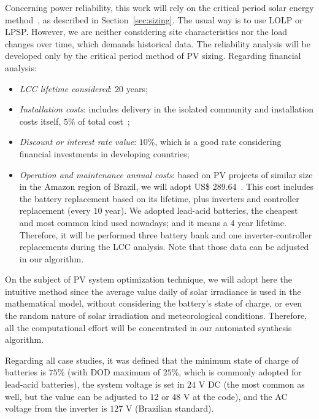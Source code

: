 \documentclass[journal]{IEEEtran}
\begin{document}
Concerning power reliability, this work will rely on the critical period solar energy method~\cite{Pinho}, as described in Section~\ref{sec:sizing}.  The usual way is to use LOLP or LPSP. However, we are neither considering site characteristics nor the load changes over time, which demands historical data. The reliability analysis will be developed only by the critical period method of PV sizing.
%
Regarding financial analysis:
\begin{itemize}
	\item \textit{LCC lifetime considered}: $20$ years;
	\item \textit{Installation costs}: includes delivery in the isolated community and installation costs itself, $5$\% of total cost~\cite{Agrener2013};
	\item \textit{Discount or interest rate value}: $10$\%, which is a good rate considering financial investments in developing countries;
	\item \textit{Operation and maintenance annual costs}: based on PV projects of similar size in the Amazon region of Brazil, we will adopt US\$ 289.64~\cite{Agrener2013}. This cost includes the battery replacement based on its lifetime, plus inverters and controller replacement (every $10$ year). We adopted lead-acid batteries, the cheapest and most common kind used nowadays; and it means a $4$ year lifetime. Therefore, it will be performed three battery bank and one inverter-controller replacements during the LCC analysis. Note that those data can be adjusted in our algorithm.
\end{itemize}

On the subject of PV system optimization technique, we will adopt here the intuitive method since the average value daily of solar irradiance is used in the mathematical model,  without considering the battery's state of charge, or even the random nature of solar irradiation and meteorological conditions. Therefore, all the computational effort will be concentrated in our automated synthesis algorithm.

Regarding all case studies, it was defined that the minimum state of charge of batteries is $75$\% (with DOD maximum of $25$\%, which is commonly adopted for lead-acid batteries), the system voltage is set in $24$ V DC (the most common as well, but the value can be adjusted to $12$ or $48$ V at the code), and the AC voltage from the inverter is $127$ V (Brazilian standard).
\end{document}
